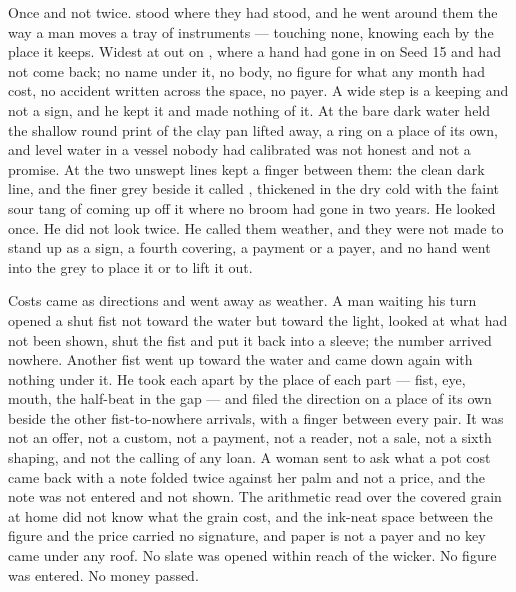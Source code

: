 Once and not twice.  stood where they had stood, and he went around them the way a man moves a tray of instruments --- touching none, knowing each by the place it keeps. Widest at  out on , where a hand had gone in on Seed 15 and had not come back; no name under it, no body, no figure for what any month had cost, no accident written across the space, no payer. A wide step is a keeping and not a sign, and he kept it and made nothing of it. At  the bare dark water held the shallow round print of the clay pan lifted away, a ring on a place of its own, and level water in a vessel nobody had calibrated was not honest and not a promise. At  the two unswept lines kept a finger between them: the clean dark line, and the finer grey beside it called , thickened in the dry cold with the faint sour tang of  coming up off it where no broom had gone in two years. He looked once. He did not look twice. He called them weather, and they were not made to stand up as a sign, a fourth covering, a payment or a payer, and no hand went into the grey to place it or to lift it out.

Costs came as directions and went away as weather. A man waiting his turn opened a shut fist not toward the water but toward the light, looked at what had not been shown, shut the fist and put it back into a sleeve; the number arrived nowhere. Another fist went up toward the water and came down again with nothing under it. He took each apart by the place of each part --- fist, eye, mouth, the half-beat in the gap --- and filed the direction on a place of its own beside the other fist-to-nowhere arrivals, with a finger between every pair. It was not an offer, not a custom, not a payment, not a reader, not a sale, not a sixth shaping, and not the calling of any loan. A woman sent to ask what a pot cost came back with a note folded twice against her palm and not a price, and the note was not entered and not shown. The arithmetic read over the covered grain at home did not know what the grain cost, and the ink-neat space between the figure and the price carried no signature, and paper is not a payer and no key came under any roof. No slate was opened within reach of the wicker. No figure was entered. No money passed.

